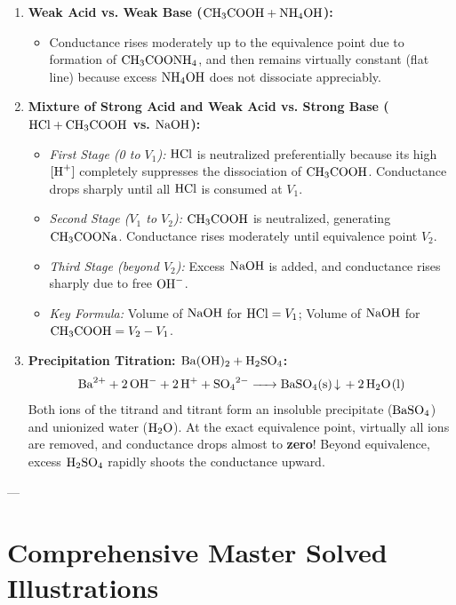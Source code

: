 \begin{enumerate}[leftmargin=*]
    \item \textbf{Weak Acid vs. Weak Base ($\ce{CH3COOH} + \ce{NH4OH}$):}
    \begin{itemize}
        \item Conductance rises moderately up to the equivalence point due to formation of $\ce{CH3COONH4}$, and then remains virtually constant (flat line) because excess $\ce{NH4OH}$ does not dissociate appreciably.
    \end{itemize}

    \item \textbf{Mixture of Strong Acid and Weak Acid vs. Strong Base ($\ce{HCl} + \ce{CH3COOH}$ vs. $\ce{NaOH}$):}
    \begin{itemize}
        \item \emph{First Stage (0 to $V_1$):} $\ce{HCl}$ is neutralized preferentially because its high $[\ce{H+}]$ completely suppresses the dissociation of $\ce{CH3COOH}$. Conductance drops sharply until all $\ce{HCl}$ is consumed at $V_1$.
        \item \emph{Second Stage ($V_1$ to $V_2$):} $\ce{CH3COOH}$ is neutralized, generating $\ce{CH3COONa}$. Conductance rises moderately until equivalence point $V_2$.
        \item \emph{Third Stage (beyond $V_2$):} Excess $\ce{NaOH}$ is added, and conductance rises sharply due to free $\ce{OH-}$.
        \item \emph{Key Formula:} Volume of $\ce{NaOH}$ for $\ce{HCl} = V_1$; Volume of $\ce{NaOH}$ for $\ce{CH3COOH} = V_2 - V_1$.
    \end{itemize}

    \item \textbf{Precipitation Titration: $\ce{Ba(OH)2} + \ce{H2SO4}$:}
    \begin{equation}
        \ce{Ba^2+ + 2OH- + 2H+ + SO4^2- -> BaSO4(s) v + 2H2O(l)}
    \end{equation}
    Both ions of the titrand and titrant form an insoluble precipitate ($\ce{BaSO4}$) and unionized water ($\ce{H2O}$). At the exact equivalence point, virtually all ions are removed, and conductance drops almost to \textbf{zero}! Beyond equivalence, excess $\ce{H2SO4}$ rapidly shoots the conductance upward.
\end{enumerate}

---

\section{Comprehensive Master Solved Illustrations}

